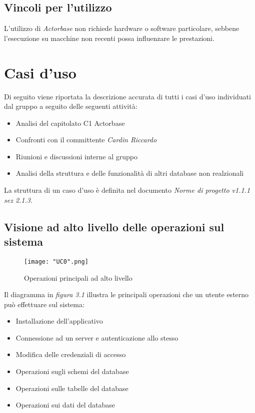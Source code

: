 \documentclass[a4paper]{report}
\newcommand{\mychapter}[2]{
	\setcounter{chapter}{#1}
	\setcounter{section}{0}
	\setcounter{subsection}{1}
	\chapter*{#2}
	\addcontentsline{toc}{chapter}{#2}
}
\begin{document}
	\section{Vincoli per l'utilizzo}
		L'utilizzo di \emph{Actorbase} non richiede hardware o software particolare, sebbene l'esecuzione 
		su macchine non recenti possa influenzare le prestazioni.	
	
	\mychapter{3}{Casi d'uso}
		Di seguito viene riportata la descrizione accurata di tutti i casi d'uso individuati dal gruppo a seguito
		delle seguenti attività:
		\begin{itemize}
			\item Analisi del capitolato C1 Actorbase
			\item Confronti con il committente \emph{Cardin Riccardo}
			\item Riunioni e discussioni interne al gruppo
			\item Analisi della struttura e delle funzionalità di altri database non realzionali
		\end{itemize}
		La struttura di un caso d'uso è definita nel documento \emph{Norme di progetto v1.1.1 sez 2.1.3}.
		\newpage
		\section{Visione ad alto livello delle operazioni sul sistema}
		 	\begin{figure}[H]
				\centering
				\texttt{[image: "UC0".png]}
				\caption{Operazioni principali ad alto livello}
			\end{figure}
			Il diagramma in \emph{figura 3.1} illustra le principali operazioni che un utente esterno può
			 effettuare sul sistema:
			\begin{itemize}
				\item Installazione dell'applicativo
				\item Connessione ad un server e autenticazione allo stesso
				\item Modifica delle credenziali di accesso
				\item Operazioni sugli schemi del database
				\item Operazioni sulle tabelle del database
				\item Operazioni sui dati del database
			\end{itemize}
\end{document}
